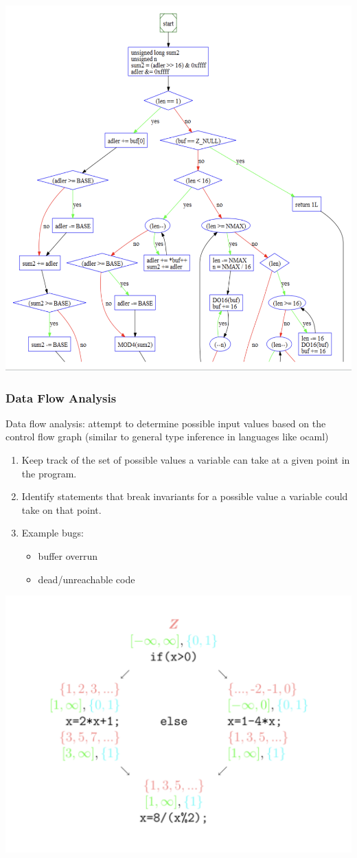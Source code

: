 \documentclass{article}
\begin{document}
\includegraphics*[width=0.8\linewidth]{abstractInterpretation.png}

\subsubsection{Data Flow Analysis}
Data flow analysis: attempt to determine possible input values based on the control flow graph (similar to general type inference in languages like ocaml)

\begin{enumerate}
    \item Keep track of the set of possible values a variable can take at a given point in the program. 
    \item Identify statements that break invariants for a possible value a variable could take on that point.
    \item Example bugs:
    \begin{itemize}
        \item buffer overrun 
        \item dead/unreachable code 
    \end{itemize}
\end{enumerate}

\includegraphics*[width=0.7\linewidth]{dataFlowAnalysis.png}
\end{document}
